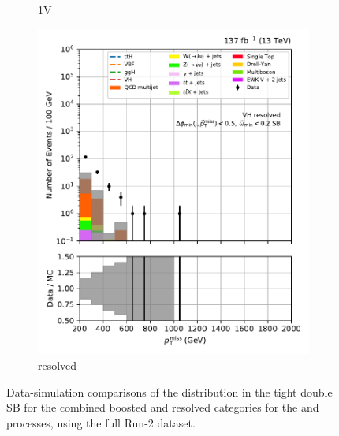\begin{figure}[htbp]
\begin{subfigure}[b]{0.24\textwidth}
        \caption{\VH 1V}
    \end{subfigure}
    \hfill
    \begin{subfigure}[b]{0.24\textwidth}
        \includegraphics[width=\textwidth]{figures/region_plots/full_Run2/sideband_0/VH_resolved.pdf}
        \caption{\VH resolved}
    \end{subfigure}
    \caption[Data-simulation comparisons of the \ptmiss distribution in the tight double sideband for the combined boosted and resolved categories for the \ttH and \VH processes, using the full Run-2 dataset]{Data-simulation comparisons of the \ptmiss distribution in the tight double \gls{SB} for the combined boosted and resolved categories for the \ttH and \VH processes, using the full Run-2 dataset.}
    \label{fig:htoinv_sb_yields_comb2016to18_tight_double}
\end{figure}

